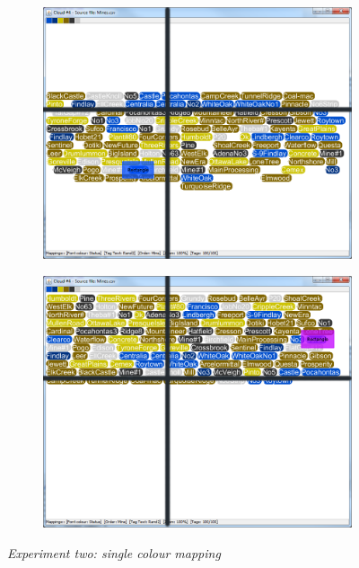\begin{figure}[!htb]
\begin{subfigure}{.5\textwidth}
  \includegraphics[scale=0.25]{Experiment2/T4/M2Spiral.png}
\end{subfigure}%
\begin{subfigure}{.5\textwidth}
  \centering
 \includegraphics[scale=0.25]{Experiment2/T4/M2Typewriter.png}
\end{subfigure}
\caption{\textit{Experiment two: single colour mapping}}
\end{figure}

